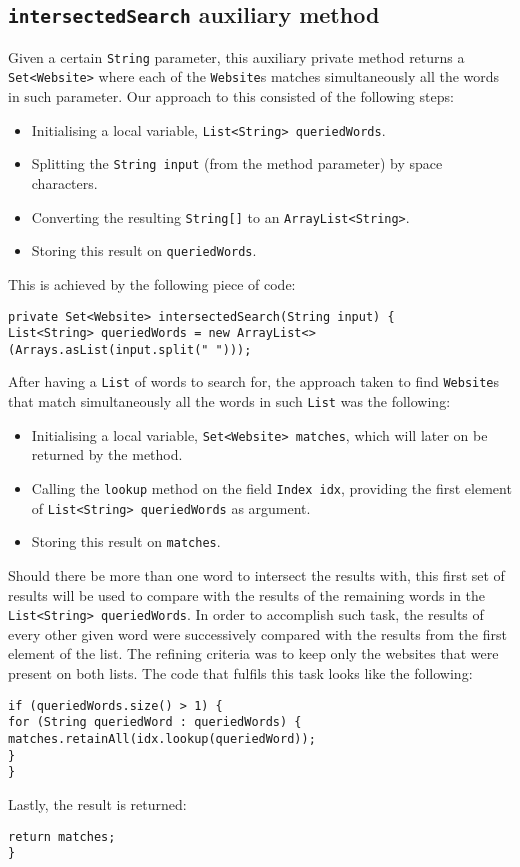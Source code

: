 \subsection{{\tt intersectedSearch} auxiliary method}
Given a certain {\tt String} parameter, this auxiliary private method returns a {\tt Set<Website>} where each of the {\tt Website}s matches simultaneously all the words in such parameter. Our approach to this consisted of the following steps:
\begin{itemize}
    \item Initialising a local variable, {\tt List<String> queriedWords}.
    \item Splitting the {\tt String input} (from the method parameter) by space characters.
    \item Converting the resulting {\tt String[]} to an {\tt ArrayList<String>}.
    \item Storing this result on {\tt queriedWords}.
\end{itemize}
This is achieved by the following piece of code:
\begin{lstlisting}
private Set<Website> intersectedSearch(String input) {
List<String> queriedWords = new ArrayList<>(Arrays.asList(input.split(" ")));
\end{lstlisting}
After having a {\tt List} of words to search for, the approach taken to find {\tt Website}s that match simultaneously all the words in such {\tt List} was the following:
\begin{itemize}
    \item Initialising a local variable, {\tt Set<Website> matches}, which will later on be returned by the method.
    \item Calling the {\tt lookup} method on the field {\tt Index idx}, providing the first element of {\tt List<String> queriedWords} as argument.
    \item Storing this result on {\tt matches}.
\end{itemize}
Should there be more than one word to intersect the results with, this first set of results will be used to compare with the results of the remaining words in the {\tt List<String> queriedWords}. In order to accomplish such task, the results of every other given word were successively compared with the results from the first element of the list. The refining criteria was to keep only the websites that were present on both lists. The code that fulfils this task looks like the following:
\begin{lstlisting}
if (queriedWords.size() > 1) {
for (String queriedWord : queriedWords) {
matches.retainAll(idx.lookup(queriedWord));
}
}
\end{lstlisting}
Lastly, the result is returned:
\begin{lstlisting}
return matches;
}
\end{lstlisting}
